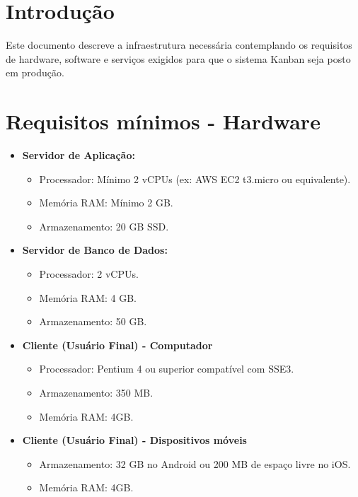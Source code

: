 \section{Introdução}
Este documento descreve a infraestrutura necessária contemplando os requisitos de hardware, software e serviços exigidos para que o sistema Kanban seja posto em produção.

\section{Requisitos mínimos - Hardware}
\begin{itemize}
    \item \textbf{Servidor de Aplicação:} 
    \begin{itemize}
        \item Processador: Mínimo 2 vCPUs (ex: AWS EC2 t3.micro ou equivalente).
        \item Memória RAM: Mínimo 2 GB.
        \item Armazenamento: 20 GB SSD.
    \end{itemize}
    \item \textbf{Servidor de Banco de Dados:} 
    \begin{itemize}
        \item Processador: 2 vCPUs.
        \item Memória RAM: 4 GB.
        \item Armazenamento: 50 GB.
    \end{itemize}
    \item \textbf{Cliente (Usuário Final) - Computador}
    \begin{itemize}
        \item Processador: Pentium 4 ou superior compatível com SSE3.
        \item Armazenamento: 350 MB.
        \item Memória RAM: 4GB.
    \end{itemize}
    \item \textbf{Cliente (Usuário Final) - Dispositivos móveis}
    \begin{itemize}
        \item Armazenamento: 32 GB no Android ou 200 MB de espaço livre no iOS.
        \item Memória RAM: 4GB.
    \end{itemize}
\end{itemize}

